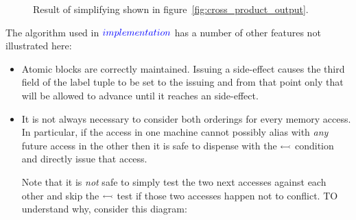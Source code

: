 \begin{figure}
  \caption{Result of simplifying {\StateMachine} shown in figure~\ref{fig:cross_product_output}.}
  \label{fig:cross_product_output_opt}
\end{figure}

The algorithm used in $\textcolor{blue}{implementation}$ has a number of other features
not illustrated here:

\begin{itemize}
\item
  Atomic blocks are correctly maintained.  Issuing a
   side-effect causes the third field of the label
  tuple to be set to the issuing {\StateMachine} and from that point
  only that {\StateMachine} will be allowed to advance until it
  reaches an  side-effect.  

\item
  It is not always necessary to consider both orderings for every
  memory access.  In particular, if the access in one machine cannot
  possibly alias with \emph{any} future access in the other then it is
  safe to dispense with the $\leftarrowtail$ condition and directly
  issue that access.


  Note that it is \emph{not} safe to simply test the two next accesses
  against each other and skip the $\leftarrowtail$ test if those two
  accesses happen not to conflict.  TO understand why, consider this
  diagram:



\end{itemize}

